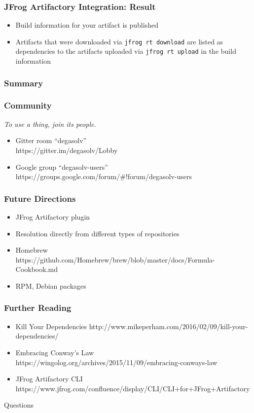 \documentclass{beamer}
\begin{document}
\begin{frame}
  \frametitle{JFrog Artifactory Integration: Result}
  \begin{itemize}
  \item Build information for your artifact is published
  \item Artifacts that were downloaded via \texttt{jfrog rt download} are listed as
    dependencies to the artifacts uploaded via \texttt{jfrog rt upload} in the build
    information
  \end{itemize}
\end{frame}
\begin{frame}
  \frametitle{Summary}
\end{frame}
\begin{frame}
  \frametitle{Community}
  \textit{To use a thing, join its people.}

  \break

  \begin{itemize}
  \item Gitter room ``degasolv'' \\
    {\small https://gitter.im/degasolv/Lobby}
  \item Google group ``degasolv-users'' \\
    {\small https://groups.google.com/forum/\#!forum/degasolv-users}
  \end{itemize}
\end{frame}
\begin{frame}
  \frametitle{Future Directions}
  \begin{itemize}
  \item JFrog Artifactory plugin
  \item Resolution directly from different types of repositories
  \item Homebrew \\
    {\small https://github.com/Homebrew/brew/blob/master/docs/Formula-Cookbook.md}
  \item RPM, Debian packages
  \end{itemize}
\end{frame}
\begin{frame}
  \frametitle{Further Reading}
  \begin{itemize}
  \item Kill Your Dependencies {\small http://www.mikeperham.com/2016/02/09/kill-your-dependencies/}
  \item Embracing Conway's Law {\small https://wingolog.org/archives/2015/11/09/embracing-conways-law}
  \item JFrog Artifactory CLI {\small https://www.jfrog.com/confluence/display/CLI/CLI+for+JFrog+Artifactory}
  \end{itemize}
\end{frame}
\begin{frame}
  \centerline{\color{blue}\Large Questions}
\end{frame}
\end{document}
